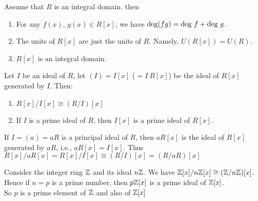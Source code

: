 \begin{proposition}
Assume that $R$ is an integral domain. then
\begin{enumerate}[label=(\roman*)]
\item For any $f(x)$, $g(x) \in R[x]$, we have $\degs(fg) = \degs \ f + \degs \ g$.
\item The units of $R[x]$ are just the units of $R$. Namely, $U(R[x]) = U(R)$.
\item $R[x]$ is an integral domain.
\end{enumerate}
\end{proposition}

\begin{proposition}
Let $I$ be an ideal of $R$, let $(I) = I[x]$ ($=I\ R[x]$) be the ideal of $R[x]$ generated by $I$. Then:
\begin{enumerate}[label=(\roman*)]
\item $R[x] / I[x] \cong (R/I) [x]$
\item If $I$ is a prime ideal of $R$, then $I[x]$ is a prime ideal of $R[x]$.
\end{enumerate}
\end{proposition}

\begin{example}
If $I=(a)=aR$ is a principal ideal of $R$, then $aR[x]$ is the ideal of $R[x]$ generated by $aR$, i.e., $aR[x] = I[x]$. Thus $R[x]/aR[x]=R[x]/I[x] \cong (R/I)[x] = (R/aR) [x]$	
\end{example}

\begin{example}
Consider the integer ring $\mathbb{Z}$ and its ideal $n\mathbb{Z}$. We have $\mathbb{Z}[x]/n\mathbb{Z}[x] \cong (\mathbb{Z}/n\mathbb{Z})[x]$.\\
Hence if $n=p$ is a prime number, then $p\mathbb{Z}[x]$ is a prime ideal of $\mathbb{Z}[x]$.\\
So $p$ is a prime element of $\mathbb{Z}$ and also of $\mathbb{Z}[x]$
\end{example}

